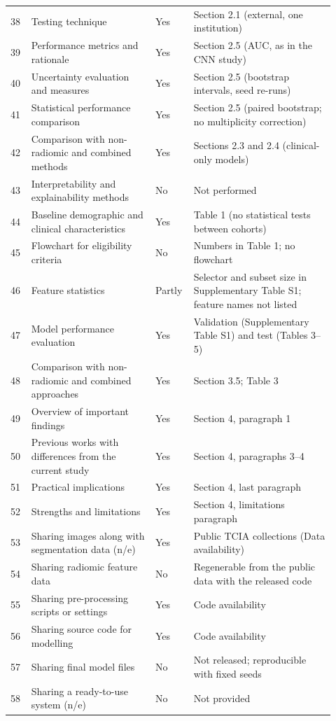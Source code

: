 \begin{longtable}{@{}L{0.06\linewidth}L{0.36\linewidth}L{0.08\linewidth}L{0.415\linewidth}@{}}
38 & Testing technique & Yes & Section 2.1 (external, one institution) \\
39 & Performance metrics and rationale & Yes & Section 2.5 (AUC, as in the CNN study) \\
40 & Uncertainty evaluation and measures & Yes & Section 2.5 (bootstrap intervals, seed re-runs) \\
41 & Statistical performance comparison & Yes & Section 2.5 (paired bootstrap; no multiplicity correction) \\
42 & Comparison with non-radiomic and combined methods & Yes & Sections 2.3 and 2.4 (clinical-only models) \\
43 & Interpretability and explainability methods & No & Not performed \\
44 & Baseline demographic and clinical characteristics & Yes & Table 1 (no statistical tests between cohorts) \\
45 & Flowchart for eligibility criteria & No & Numbers in Table 1; no flowchart \\
46 & Feature statistics & Partly & Selector and subset size in Supplementary Table S1; feature names not listed \\
47 & Model performance evaluation & Yes & Validation (Supplementary Table S1) and test (Tables 3--5) \\
48 & Comparison with non-radiomic and combined approaches & Yes & Section 3.5; Table 3 \\
49 & Overview of important findings & Yes & Section 4, paragraph 1 \\
50 & Previous works with differences from the current study & Yes & Section 4, paragraphs 3--4 \\
51 & Practical implications & Yes & Section 4, last paragraph \\
52 & Strengths and limitations & Yes & Section 4, limitations paragraph \\
53 & Sharing images along with segmentation data (n/e) & Yes & Public TCIA collections (Data availability) \\
54 & Sharing radiomic feature data & No & Regenerable from the public data with the released code \\
55 & Sharing pre-processing scripts or settings & Yes & Code availability \\
56 & Sharing source code for modelling & Yes & Code availability \\
57 & Sharing final model files & No & Not released; reproducible with fixed seeds \\
58 & Sharing a ready-to-use system (n/e) & No & Not provided \\
\end{longtable}

